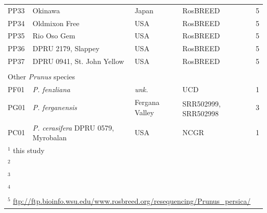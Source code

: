 \documentclass[12pt]{article}
\begin{document}
\begin{center}
\begin{longtable}{lllll}
	PP33 &Okinawa &Japan &RosBREED &5\\
	PP34 &Oldmixon Free &USA &RosBREED &5\\
	PP35 &Rio Oso Gem &USA &RosBREED &5\\
	PP36 &DPRU 2179, Slappey &USA &RosBREED &5\\
	PP37 &DPRU 0941, St. John Yellow &USA &RosBREED &5\\
	\\
	\multicolumn{5}{l}{Other \emph{Prunus} species}  \\
	PF01 &\emph{P. fenzliana} &\emph{unk.} &UCD &1\\
	PG01 &\emph{P. ferganensis} &Fergana Valley &
	\multirow{2}{1cm}{SRR502999, SRR502998} &3\\
	\\
	PC01 &\emph{P. cerasifera} DPRU 0579, Myrobalan &USA &NCGR &1\\ \hline \hline
	\multicolumn{5}{l}{$^{1}$ this study}\\
	\multicolumn{5}{l}{$^{2}$ \citealp{koepke2013comparative}}\\
	\multicolumn{5}{l}{$^{3}$ \citealp{verde2013high}}\\
	\multicolumn{5}{l}{$^{4}$ \citealp{ahmad2011whole}}\\
	\multicolumn{5}{l}{$^{5}$ \url{ftp://ftp.bioinfo.wsu.edu/www.rosbreed.org/resequencing/Prunus_persica/}}\\
\end{longtable}
\end{center}
\end{document}
